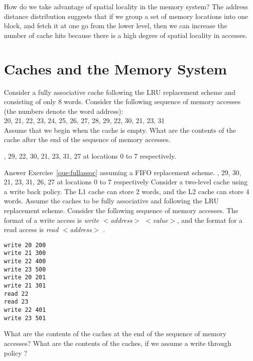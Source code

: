 \begin{ExerciseList}
\Exercise How do we take advantage of spatial locality in the memory system?
\Answer
The address distance distribution suggests that if we group a set of memory locations into one block, and fetch it at one go from the lower level, then we can increase the number of cache hits because there is a high degree of spatial locality in accesses.


\end{ExerciseList}

\section*{Caches and the Memory System}

\begin{ExerciseList}

\Exercise
\label{que:fullassoc}
Consider a fully associative cache following  the LRU replacement scheme
and consisting of only 8 words. Consider the
following sequence of memory accesses (the numbers denote the word address): \\
20, 21, 22, 23, 24, 25, 26, 27, 28, 29, 22, 30, 21, 23, 31\\

Assume that we begin when the cache is empty. What are the contents of
the cache after the end of the sequence of memory accesses.


, 29, 22, 30, 21, 23, 31, 27 at locations 0 to 7 respectively.

\Exercise
Answer Exercise~\ref{que:fullassoc} assuming a FIFO replacement scheme.
, 29, 30, 21, 23, 31, 26, 27 at locations 0 to 7 respectively 
\Exercise
Consider a two-level cache using a write back policy. The L1 cache can store 2 words,
and the L2 cache can store 4 words. Assume the
caches to be fully associative and following  the 
LRU replacement scheme.  Consider the following
sequence of memory accesses. The format of a write access is {\em write $<$address$>$ $<$value$>$},
and the format for a read access is {\em read $<$address$>$ }.

\begin{Verbatim}[frame=single]
write 20 200
write 21 300
write 22 400
write 23 500
write 20 201
write 21 301
read 22
read 23
write 22 401
write 23 501
\end{Verbatim}

What are the contents of the caches at the end of the sequence of memory accesses?
What are the contents of the caches, if we assume a write through policy ?


\end{ExerciseList}
